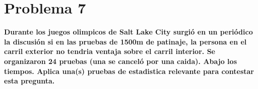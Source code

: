 \section*{Problema 7}

\textbf{Durante los juegos olimpicos de Salt Lake City surgió en un periódico la discusión si en las pruebas de 1500m de patinaje, la persona en el carril exterior no tendria ventaja sobre el carril interior. Se organizaron 24 pruebas (una se canceló por una caida). Abajo los tiempos. Aplica una(s) pruebas de estadistica relevante para contestar esta pregunta.}
